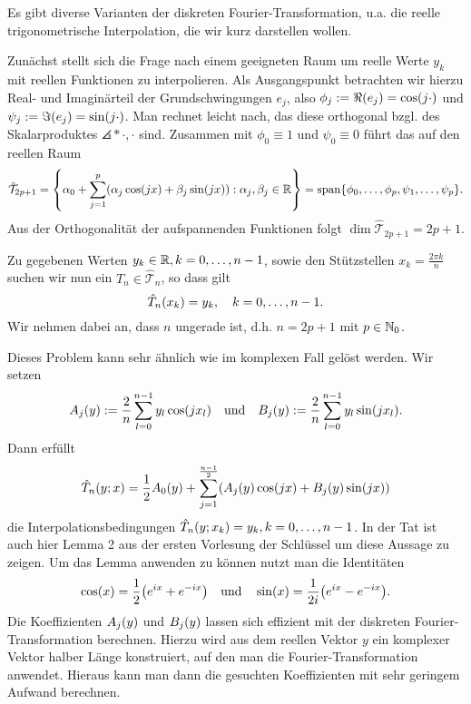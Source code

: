 \documentclass{lecture}
\begin{document}
    \begin{remark}
        Es gibt diverse  Varianten der diskreten Fourier-Transformation, u.a. die reelle trigonometrische Interpolation, die wir kurz darstellen wollen.

        Zunächst stellt sich die Frage nach einem geeigneten Raum um reelle Werte \(y_k\) mit reellen Funktionen zu interpolieren.
        Als Ausgangspunkt betrachten wir hierzu Real- und Imaginärteil der Grundschwingungen \(e_j\), also \(\phi_j := \Re\parentheses*{e_j} = \cos\parentheses*{j\cdot}\) und \(\psi_j := \Im\parentheses*{e_j} = \sin\parentheses*{j\cdot}\).
        Man rechnet leicht nach, das diese orthogonal bzgl. des Skalarproduktes \(\angles*{\cdot, \cdot}\) sind.
        Zusammen mit \(\phi_0 \equiv 1\) und \(\psi_0 \equiv 0\) führt das auf den reellen Raum
        \[
            \hat{\mathcal{T}}_{2p + 1} = \braces*{\alpha_0 + \sum_{j = 1}^p\parentheses*{\alpha_j\cos\parentheses*{jx} + \beta_j\sin\parentheses*{jx}} : \alpha_j, \beta_j \in \R} = \setspan\braces*{\phi_0, \ldots, \phi_p, \psi_1, \ldots, \psi_p}.
        \]
        Aus der Orthogonalität der aufspannenden Funktionen folgt \(\dim\hat{\mathcal{T}}_{2p + 1} = 2p + 1\).

        Zu gegebenen Werten \(y_k \in \mathbb{R}, k = 0, \ldots, n - 1\), sowie den Stützstellen \(x_k = \frac{2\pi k}{n}\) suchen wir nun ein \(\hat{T}_n \in \hat{\mathcal{T}}_n\), so dass gilt
        \[
            \hat{T}_n\parentheses*{x_k} = y_k, \quad k = 0, \ldots, n - 1.
        \]
        Wir nehmen dabei an, dass \(n\) ungerade ist, d.h. \(n = 2p + 1\) mit \(p \in \mathbb{N}_0\).

        Dieses Problem kann sehr ähnlich wie im komplexen Fall gelöst werden.
        Wir setzen
        \[
            A_j\parentheses*{y} := \frac{2}{n}\sum_{l = 0}^{n - 1}y_l\cos\parentheses*{jx_l} \quad \text{und} \quad B_j\parentheses*{y} := \frac{2}{n}\sum_{l = 0}^{n - 1}y_l\sin\parentheses*{jx_l}.
        \]
        Dann erfüllt
        \[
            \hat{T}_n\parentheses*{y; x} = \frac{1}{2}A_0\parentheses*{y} + \sum_{j = 1}^{\frac{n - 1}{2}}\parentheses*{A_j\parentheses*{y}\cos\parentheses*{jx} + B_j\parentheses*{y}\sin\parentheses*{jx}}
        \]
        die Interpolationsbedingungen \(\hat{T}_n\parentheses*{y; x_k} = y_k, k = 0, \ldots, n - 1\).
        In der Tat ist auch hier Lemma 2 aus der ersten Vorlesung der Schlüssel um diese Aussage zu zeigen.
        Um das Lemma anwenden zu können nutzt man die Identitäten
        \[
            \cos\parentheses*{x} = \frac{1}{2}\parentheses*{e^{ix} + e^{-ix}} \quad \text{und} \quad \sin\parentheses*{x} = \frac{1}{2i}\parentheses*{e^{ix} - e^{-ix}}.
        \]
        Die Koeffizienten \(A_j\parentheses*{y}\) und \(B_j\parentheses*{y}\) lassen sich effizient mit der diskreten Fourier-Transformation berechnen.
        Hierzu wird aus dem reellen Vektor \(y\) ein komplexer Vektor halber Länge konstruiert, auf den man die Fourier-Transformation anwendet.
        Hieraus kann man dann die gesuchten Koeffizienten mit sehr geringem Aufwand berechnen.
    \end{remark}
\end{document}
